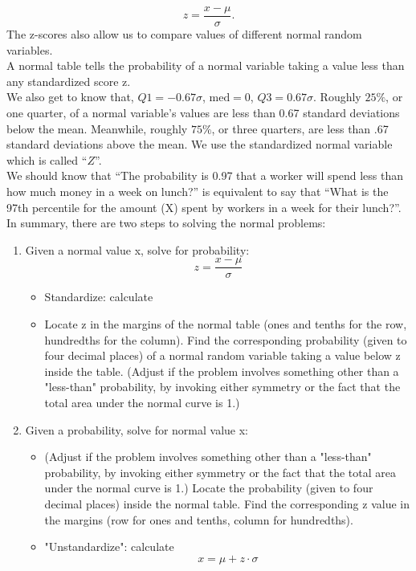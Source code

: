 \documentclass[10pt, a4paper]{article}
\begin{document}
\[
    z=\frac{x-\mu}{\sigma}.
\]
The z-scores also allow us to compare values of different normal random variables.\\
A normal table tells the probability of a normal variable taking a value less than any standardized score z.\\
We also get to know that, $Q1=-0.67\sigma$, $\text{med}=0$, $Q3=0.67\sigma$. 
Roughly $25\%$, or one quarter, of a normal variable's values are less than 0.67 standard deviations below the mean. Meanwhile, roughly $75\%$, or three quarters, are less than .67 standard deviations above the mean.
We use the standardized normal variable which is called ``$Z$''.\\
We should know that ``The probability is 0.97 that a worker will spend less than how much money in a week on lunch?'' is equivalent to say that ``What is the 97th percentile for the amount (X) spent by workers in a week for their lunch?''.\\[1mm]
In summary, there are two steps to solving the normal problems:
\begin{enumerate}
\item Given a normal value x, solve for probability:
  \[
    z=\frac{x-\mu}{\sigma}
  \]
\begin{itemize}
\item Standardize: calculate
\item Locate z in the margins of the normal table (ones and tenths for the row, hundredths for the column). Find the corresponding probability (given to four decimal places) of a normal random variable taking a value below z inside the table. (Adjust if the problem involves something other than a "less-than" probability, by invoking either symmetry or the fact that the total area under the normal curve is 1.)
\end{itemize}
\item Given a probability, solve for normal value x:
\begin{itemize}
\item (Adjust if the problem involves something other than a "less-than" probability, by invoking either symmetry or the fact that the total area under the normal curve is 1.) Locate the probability (given to four decimal places) inside the normal table. Find the corresponding z value in the margins (row for ones and tenths, column for hundredths).
\item "Unstandardize": calculate 
  \[
  x=\mu+z\cdot \sigma
  \]
\end{itemize}
\end{enumerate}
\end{document}
